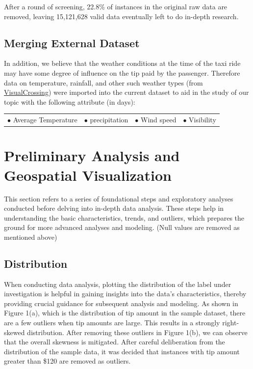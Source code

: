 \documentclass[11pt]{article}
\begin{document}
After a round of screening, 22.8\% of instances in the original raw data are removed, leaving 15,121,628 valid data eventually left to do in-depth research.

\subsection{Merging External Dataset}
In addition, we believe that the weather conditions at the time of the taxi ride may have some degree of influence on the tip paid by the passenger. Therefore data on temperature, rainfall, and other such weather types (from \href{https://www.visualcrossing.com/}{VisualCrossing}) were imported into the current dataset to aid in the study of our topic with the following attribute \cite{weather}(in days):


\begin{center}
\begin{tabular}{@{}llll@{}}
$\bullet$ Average Temperature \qquad & $\bullet$  precipitation \qquad  & $\bullet$ Wind speed \qquad & $\bullet$ Visibility\\
\end{tabular}
\end{center}



\section{Preliminary Analysis and Geospatial Visualization}
This section refers to a series of foundational steps and exploratory analyses conducted before delving into in-depth data analysis. These steps help in understanding the basic characteristics, trends, and outliers, which prepares the ground for more advanced analyses and modeling. (Null values are removed as mentioned above)

\subsection{Distribution}
When conducting data analysis, plotting the distribution of the label under investigation is helpful in gaining insights into the data's characteristics, thereby providing crucial guidance for subsequent analysis and modeling. As shown in Figure 1(a), which is the distribution of tip amount in the sample dataset, there are a few outliers when tip amounts are large. This results in a strongly right-skewed distribution. After removing these outliers in Figure 1(b), we can observe that the overall skewness is mitigated. After careful deliberation from the distribution of the sample data, it was decided that instances with tip amount greater than \$120 are removed as outliers. 
\end{document}
